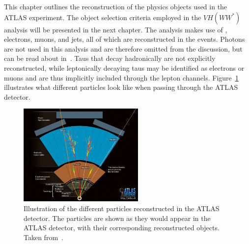 This chapter outlines the reconstruction of the physics objects used in the ATLAS experiment. The object selection criteria employed in the $VH(WW^{*})$ analysis will be presented in the next chapter. The analysis makes use of \met{}, electrons, muons, and jets, all of which are reconstructed in the events. Photons are not used in this analysis and are therefore omitted from the discussion, but can be read about in~\cite{ATLAS:2019qmc}. Taus that decay hadronically are not explicitly reconstructed, while leptonically decaying taus may be identified as electrons or muons and are thus implicitly included through the lepton channels. Figure~\ref{fig:reco_atlas_particles} illustrates what different particles look like when passing through the ATLAS detector.

\begin{figure}[hpt]
  \centering
  \includegraphics[width=0.55\textwidth]{figures/reco/reco_atlas_particles.png}
  \caption{Illustration of the different particles reconstructed in the ATLAS detector. The particles are shown as they would appear in the ATLAS detector, with their corresponding reconstructed objects. Taken from~\cite{reco_particles}.}\label{fig:reco_atlas_particles}
\end{figure}